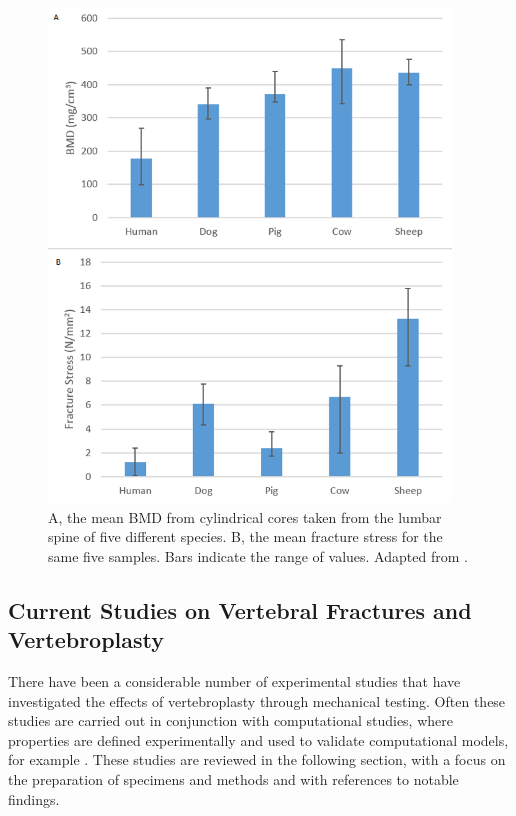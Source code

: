 \begin{figure}[hbt]

\centering
  \includegraphics[width=4.21209in,height=5.15601in]{images/bmdGraph.png}
  \caption{A, the mean BMD from
cylindrical cores taken from the lumbar spine of five different species.
B, the mean fracture stress for the same five samples. Bars indicate the
range of values. Adapted from
\cite{aerssens_jeroen_boonen_steven_geert_dequeker_1998}.}
\label{fig:bmdgraph}
\end{figure}

\subsection{Current Studies on Vertebral Fractures and Vertebroplasty
}\label{current-studies-on-vertebral-fractures-and-vertebroplasty}

There have been a considerable number of experimental studies that have investigated the
effects of vertebroplasty through mechanical testing. Often
these studies are carried out in conjunction with computational studies,
where properties are defined experimentally and used to validate
computational models, for example \cite{Wijayathunga2008}. These studies are reviewed in the following section, with a focus on the preparation of
specimens and
methods and with references to notable findings.

